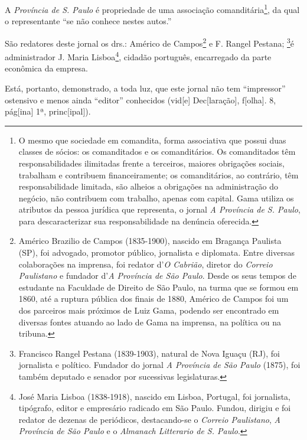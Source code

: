 A \emph{Província de S. Paulo} é propriedade de uma associação
comanditária\footnote{O mesmo que sociedade em comandita, forma
  associativa que possui duas classes de sócios: os comanditados e os
  comanditários. Os comanditados têm responsabilidades ilimitadas frente
  a terceiros, maiores obrigações sociais, trabalham e contribuem
  financeiramente; os comanditários, ao contrário, têm responsabilidade
  limitada, são alheios a obrigações na administração do negócio, não
  contribuem com trabalho, apenas com capital. Gama utiliza os atributos
  da pessoa jurídica que representa, o jornal \emph{A Província de S.
  Paulo}, para descaracterizar sua responsabilidade na denúncia
  oferecida.}, da qual o representante ``se não conhece nestes autos.''

São redatores deste jornal os drs.: Américo de Campos\footnote{Américo
  Brazilio de Campos (1835-1900), nascido em Bragança Paulista (SP), foi
  advogado, promotor público, jornalista e diplomata. Entre diversas
  colaborações na imprensa, foi redator d'\emph{O Cabrião}, diretor do
  \emph{Correio Paulistano} e fundador d'\emph{A Província de São
  Paulo}. Desde os seus tempos de estudante na Faculdade de Direito de
  São Paulo, na turma que se formou em 1860, até a ruptura pública dos
  finais de 1880, Américo de Campos foi um dos parceiros mais próximos
  de Luiz Gama, podendo ser encontrado em diversas fontes atuando ao
  lado de Gama na imprensa, na política ou na tribuna.} e F. Rangel
Pestana; \footnote{Francisco Rangel Pestana (1839-1903), natural de Nova
  Iguaçu (RJ), foi jornalista e político. Fundador do jornal \emph{A
  Província de São Paulo} (1875), foi também deputado e senador por
  sucessivas legislaturas.}é administrador J. Maria Lisboa\footnote{José
  Maria Lisboa (1838-1918), nascido em Lisboa, Portugal, foi jornalista,
  tipógrafo, editor e empresário radicado em São Paulo. Fundou, dirigiu
  e foi redator de dezenas de periódicos, destacando-se o \emph{Correio
  Paulistano}, \emph{A Província de São Paulo} e o \emph{Almanach
  Litterario de S. Paulo}.}, cidadão português, encarregado da parte
econômica da empresa.

Está, portanto, demonstrado, a toda luz, que este jornal não tem
``impressor'' ostensivo e menos ainda ``editor'' conhecidos (vid{[}e{]}
Dec{[}laração{]}, f{[}olha{]}. 8, pág{[}ina{]} 1ª, princ{[}ipal{]}).

